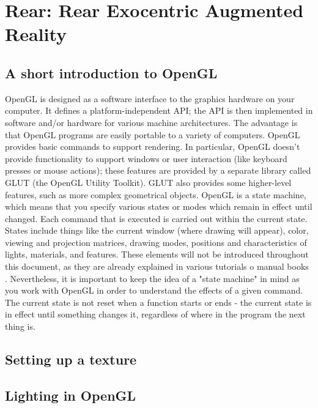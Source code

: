 \section{Rear: Rear Exocentric Augmented Reality}
\label{sec:rear}

\lstset{language=C}

\subsection{A short introduction to OpenGL}

OpenGL is designed as a software interface to the graphics hardware on your computer. It defines a platform-independent API;
the API is then implemented in software and/or hardware for various machine architectures. The advantage is that OpenGL programs
are easily portable to a variety of computers.
\newline OpenGL provides basic commands to support rendering. In particular, OpenGL doesn't provide functionality to support
windows or user interaction (like keyboard presses or mouse actions); these features are provided by a separate library called
GLUT (the OpenGL Utility Toolkit). GLUT also provides some higher-level features, such as more complex geometrical objects.
\newline OpenGL is a state machine, which means that you specify various states or modes which remain in effect until changed.
Each command that is executed is carried out within the current state. States include things like the current window (where
drawing will appear), color, viewing and projection matrices, drawing modes, positions and characteristics of lights,
materials, and features. These elements will not be introduced throughout this document, as they are already explained in
various tutorials \cite{opengl:brieftutorial} o manual books \cite{opengl:redbook}.
\newline Nevertheless, it is important to keep the idea of a "state machine" in mind as you work with OpenGL in order to 
understand the effects of a given command. The current state is not reset when a function starts or ends - the current state
is in effect until something changes it, regardless of where in the program the next thing is. 

\subsection{Setting up a texture}
\subsection{Lighting in OpenGL}
